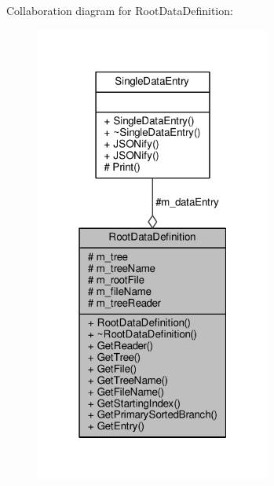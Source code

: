 Collaboration diagram for Root\+Data\+Definition\+:\nopagebreak
\begin{figure}[H]
\begin{center}
\leavevmode
\includegraphics[width=220pt]{classRootDataDefinition__coll__graph}
\end{center}
\end{figure}
